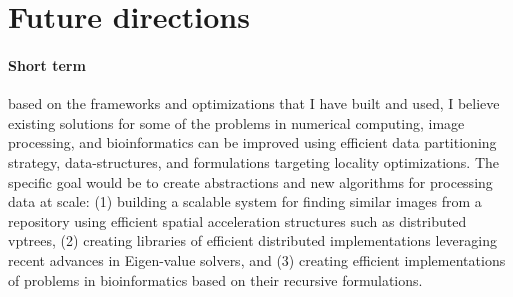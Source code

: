 


\section*{Future directions}
\paragraph{Short term} based on the frameworks and optimizations that I have built and used, I believe existing solutions for some of the problems in numerical computing, image processing, and bioinformatics can be improved using efficient data partitioning strategy, data-structures, and formulations targeting locality optimizations.  
The specific goal would be to create abstractions and new algorithms for processing data at scale:
(1) building a scalable system for finding similar images from a repository using efficient spatial acceleration structures such as distributed vptrees,
(2) creating libraries of efficient distributed implementations leveraging recent advances in Eigen-value solvers, and 
(3) creating efficient implementations of problems in bioinformatics based on their recursive formulations. 

